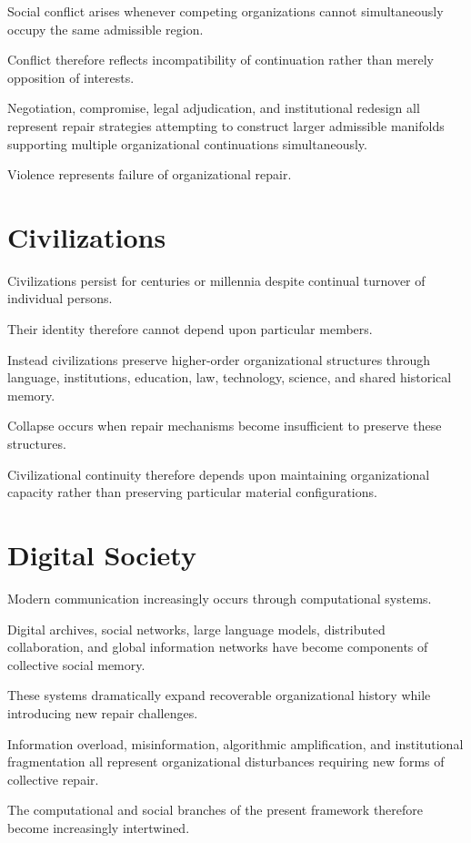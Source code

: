 \documentclass[11pt,oneside]{book}
\numberwithin{equation}{chapter}
\theoremstyle{definition}
\theoremstyle{plain}
\begin{document}
Social conflict arises whenever competing organizations cannot
simultaneously occupy the same admissible region.

Conflict therefore reflects incompatibility of continuation rather than
merely opposition of interests.

Negotiation, compromise, legal adjudication, and institutional redesign all
represent repair strategies attempting to construct larger admissible
manifolds supporting multiple organizational continuations simultaneously.

Violence represents failure of organizational repair.

\section{Civilizations}

Civilizations persist for centuries or millennia despite continual turnover
of individual persons.

Their identity therefore cannot depend upon particular members.

Instead civilizations preserve higher-order organizational structures
through language, institutions, education, law, technology, science, and
shared historical memory.

Collapse occurs when repair mechanisms become insufficient to preserve
these structures.

Civilizational continuity therefore depends upon maintaining organizational
capacity rather than preserving particular material configurations.

\section{Digital Society}

Modern communication increasingly occurs through computational systems.

Digital archives, social networks, large language models, distributed
collaboration, and global information networks have become components of
collective social memory.

These systems dramatically expand recoverable organizational history while
introducing new repair challenges.

Information overload, misinformation, algorithmic amplification, and
institutional fragmentation all represent organizational disturbances
requiring new forms of collective repair.

The computational and social branches of the present framework therefore
become increasingly intertwined.
\end{document}
